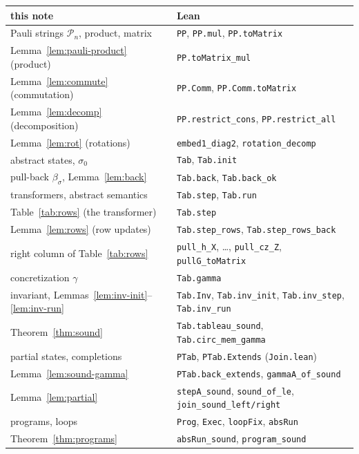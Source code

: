\documentclass[11pt]{article}
\theoremstyle{definition}
\theoremstyle{remark}
\newcommand{\Pauli}{\mathcal{P}_n}
\newcommand{\gam}{\gamma}
\newcommand{\back}{\beta}
\begin{document}
\begin{center}
\renewcommand{\arraystretch}{1.2}
\begin{tabular}{ll}
\toprule
this note & Lean \\
\midrule
Pauli strings $\Pauli$, product, matrix & \texttt{PP}, \texttt{PP.mul}, \texttt{PP.toMatrix} \\
Lemma~\ref{lem:pauli-product} (product) & \texttt{PP.toMatrix\_mul} \\
Lemma~\ref{lem:commute} (commutation) & \texttt{PP.Comm}, \texttt{PP.Comm.toMatrix} \\
Lemma~\ref{lem:decomp} (decomposition) & \texttt{PP.restrict\_cons}, \texttt{PP.restrict\_all} \\
Lemma~\ref{lem:rot} (rotations) & \texttt{embed1\_diag2}, \texttt{rotation\_decomp} \\
abstract states, $\sigma_0$ & \texttt{Tab}, \texttt{Tab.init} \\
pull-back $\back_\sigma$, Lemma~\ref{lem:back} & \texttt{Tab.back}, \texttt{Tab.back\_ok} \\
transformers, abstract semantics & \texttt{Tab.step}, \texttt{Tab.run} \\
Table~\ref{tab:rows} (the transformer) & \texttt{Tab.step} \\
Lemma~\ref{lem:rows} (row updates) & \texttt{Tab.step\_rows}, \texttt{Tab.step\_rows\_back} \\
right column of Table~\ref{tab:rows} & \texttt{pull\_h\_X}, \dots, \texttt{pull\_cz\_Z}, \texttt{pullG\_toMatrix} \\
concretization $\gam$ & \texttt{Tab.gamma} \\
invariant, Lemmas~\ref{lem:inv-init}--\ref{lem:inv-run} & \texttt{Tab.Inv}, \texttt{Tab.inv\_init}, \texttt{Tab.inv\_step}, \texttt{Tab.inv\_run} \\
Theorem~\ref{thm:sound} & \texttt{Tab.tableau\_sound}, \texttt{Tab.circ\_mem\_gamma} \\
partial states, completions & \texttt{PTab}, \texttt{PTab.Extends} (\texttt{Join.lean}) \\
Lemma~\ref{lem:sound-gamma} & \texttt{PTab.back\_extends}, \texttt{gammaA\_of\_sound} \\
Lemma~\ref{lem:partial} & \texttt{stepA\_sound}, \texttt{sound\_of\_le}, \texttt{join\_sound\_left/right} \\
programs, loops & \texttt{Prog}, \texttt{Exec}, \texttt{loopFix}, \texttt{absRun} \\
Theorem~\ref{thm:programs} & \texttt{absRun\_sound}, \texttt{program\_sound} \\

\end{tabular}
\end{center}
\end{document}
